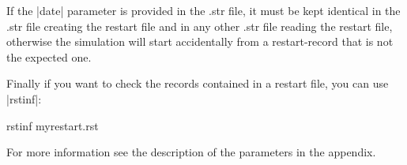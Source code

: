 If the |date| parameter is provided in the .str file, it must be kept identical in the .str file creating the restart file
 and in any other .str file reading the restart file, otherwise the simulation will start accidentally from 
a restart-record that is not the expected one.

Finally if you want to check the records contained in a restart file,
you can use |rstinf|:

\begin{code}
    rstinf myrestart.rst
\end{code}


For more information see the description of the parameters in the appendix.

